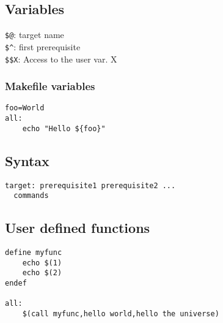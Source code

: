 \subsection{Variables}
\verb|$@|: target name\\
\verb|$^|: first prerequisite\\
\verb|$$X|: Access to the user var. X\\
\subsubsection{Makefile variables}
\begin{verbatim}
foo=World
all:
    echo "Hello ${foo}"
\end{verbatim}

\subsection{Syntax}
\begin{verbatim}
target: prerequisite1 prerequisite2 ...
  commands
\end{verbatim}

\subsection{User defined functions}
\begin{verbatim}
define myfunc
    echo $(1)
    echo $(2)
endef

all:
    $(call myfunc,hello world,hello the universe)
\end{verbatim}
